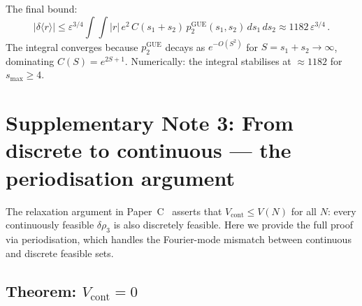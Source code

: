 \documentclass[10pt]{article}
\begin{document}
The final bound:
\begin{equation}
|\delta\langle r\rangle| \leq \varepsilon^{3/4} \int\!\!\int |r|\,e^2\,C(s_1{+}s_2)\,
p_2^{\mathrm{GUE}}(s_1, s_2)\,ds_1\,ds_2 \approx 1182\,\varepsilon^{3/4}\,.
\end{equation}
The integral converges because $p_2^{\mathrm{GUE}}$ decays as $e^{-O(S^2)}$
for $S = s_1 + s_2 \to \infty$, dominating $C(S) = e^{2S+1}$.
Numerically: the integral stabilises at $\approx 1182$ for $s_{\max} \geq 4$.


\section{Supplementary Note 3: From discrete to continuous --- the periodisation argument}

The relaxation argument in Paper~C~\cite{alarcon2026c} asserts that
$V_{\mathrm{cont}} \leq V(N)$ for all $N$: every continuously feasible
$\delta\rho_3$ is also discretely feasible.
Here we provide the full proof via periodisation, which handles
the Fourier-mode mismatch between continuous and discrete feasible sets.

\subsection{Theorem: $V_{\mathrm{cont}} = 0$}
\end{document}
